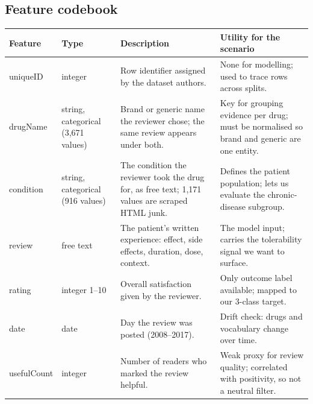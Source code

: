 \documentclass[11pt]{article}
\begin{document}
\subsection{Feature codebook}
\begin{table}[H]\centering\small
\begin{tabular}{p{2.0cm}p{2.1cm}p{5.0cm}p{5.2cm}}\toprule
Feature & Type & Description & Utility for the scenario \\\midrule
uniqueID & integer & Row identifier assigned by the dataset authors. & None for modelling; used to trace rows across splits. \\
drugName & string, categorical (3,671 values) & Brand or generic name the reviewer chose; the same review appears under both. & Key for grouping evidence per drug; must be normalised so brand and generic are one entity. \\
condition & string, categorical (916 values) & The condition the reviewer took the drug for, as free text; 1,171 values are scraped HTML junk. & Defines the patient population; lets us evaluate the chronic-disease subgroup. \\
review & free text & The patient's written experience: effect, side effects, duration, dose, context. & The model input; carries the tolerability signal we want to surface. \\
rating & integer 1--10 & Overall satisfaction given by the reviewer. & Only outcome label available; mapped to our 3-class target. \\
date & date & Day the review was posted (2008--2017). & Drift check: drugs and vocabulary change over time. \\
usefulCount & integer & Number of readers who marked the review helpful. & Weak proxy for review quality; correlated with positivity, so not a neutral filter. \\
\bottomrule\end{tabular}
\end{table}
\end{document}
